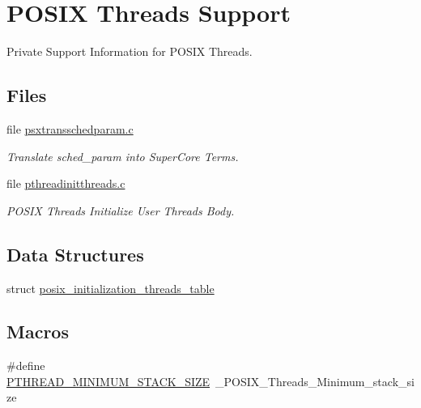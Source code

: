 \hypertarget{group__POSIX__PTHREAD}{}\section{P\+O\+S\+IX Threads Support}
\label{group__POSIX__PTHREAD}


Private Support Information for P\+O\+S\+IX Threads.  


\subsection*{Files}
\begin{DoxyCompactItemize}
\item 
file \mbox{\hyperlink{psxtransschedparam_8c}{psxtransschedparam.\+c}}
\begin{DoxyCompactList}\small\item\em Translate sched\+\_\+param into Super\+Core Terms. \end{DoxyCompactList}\item 
file \mbox{\hyperlink{pthreadinitthreads_8c}{pthreadinitthreads.\+c}}
\begin{DoxyCompactList}\small\item\em P\+O\+S\+IX Threads Initialize User Threads Body. \end{DoxyCompactList}\end{DoxyCompactItemize}
\subsection*{Data Structures}
\begin{DoxyCompactItemize}
\item 
struct \mbox{\hyperlink{structposix__initialization__threads__table}{posix\+\_\+initialization\+\_\+threads\+\_\+table}}
\end{DoxyCompactItemize}
\subsection*{Macros}
\begin{DoxyCompactItemize}
\item 
\#define \mbox{\hyperlink{group__POSIX__PTHREAD_ga804186032828ea474e2bfcba090c9bef}{P\+T\+H\+R\+E\+A\+D\+\_\+\+M\+I\+N\+I\+M\+U\+M\+\_\+\+S\+T\+A\+C\+K\+\_\+\+S\+I\+ZE}}~\+\_\+\+P\+O\+S\+I\+X\+\_\+\+Threads\+\_\+\+Minimum\+\_\+stack\+\_\+size
\end{DoxyCompactItemize}
